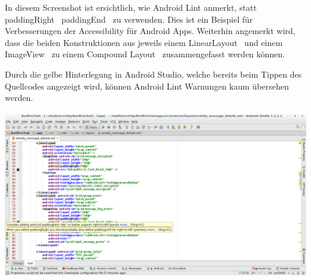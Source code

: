 In diesem Screenshot ist ersichtlich, wie Android Lint anmerkt, statt \glqq paddingRight\grqq~ \glqq paddingEnd\grqq~ zu verwenden. Dies ist ein Beispiel für Verbesserungen der Accessibility für Android Apps. Weiterhin angemerkt wird, dass die beiden Konstruktionen aus jeweils einem \glqq LinearLayout\grqq~ und einem \glqq ImageView\grqq~ zu einem \glqq Compound Layout\grqq~ zusammengefasst werden können.

Durch die gelbe Hinterlegung in Android Studio, welche bereits beim Tippen des Quellcodes angezeigt wird, können Android Lint Warnungen kaum übersehen werden.

\includegraphics[width=17.5cm]{belege/lint/android-lint-screenshot.png}
